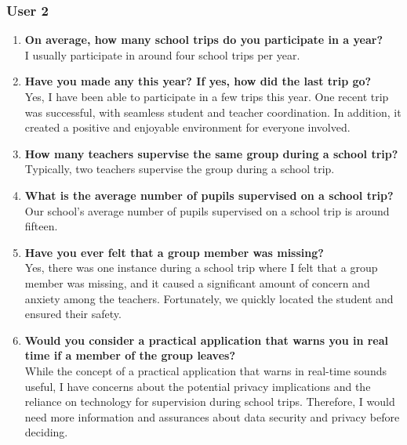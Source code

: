 \subsubsection*{User 2}
\begin{enumerate}
\item \textbf{On average, how many school trips do you participate in a year?}
\\ I usually participate in around four school trips per year.
\item \textbf{Have you made any this year? If yes, how did the last trip go?}
\\ Yes, I have been able to participate in a few trips this year. One recent trip was successful, with seamless student and teacher coordination. In addition, it created a positive and enjoyable environment for everyone involved.
\item \textbf{How many teachers supervise the same group during a school trip?}
\\ Typically, two teachers supervise the group during a school trip.
\item \textbf{What is the average number of pupils supervised on a school trip?}
\\ Our school's average number of pupils supervised on a school trip is around fifteen.
\item \textbf{Have you ever felt that a group member was missing?}
\\ Yes, there was one instance during a school trip where I felt that a group member was missing, and it caused a significant amount of concern and anxiety among the teachers. Fortunately, we quickly located the student and ensured their safety.
\item \textbf{Would you consider a practical application that warns you in real time if a member of the group leaves?}
\\ While the concept of a practical application that warns in real-time sounds useful, I have concerns about the potential privacy implications and the reliance on technology for supervision during school trips. Therefore, I would need more information and assurances about data security and privacy before deciding.
\end{enumerate}

